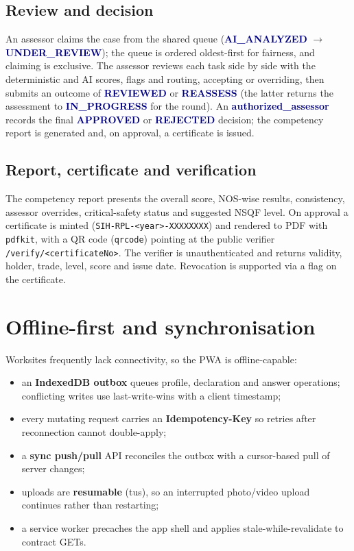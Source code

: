 \documentclass[11pt,a4paper]{article}
\newcommand{\code}[1]{\texttt{\small #1}}
\newcommand{\status}[1]{\textcolor{navy}{\textbf{#1}}}
\begin{document}
\subsection{Review and decision}
An assessor claims the case from the shared queue
(\status{AI\_ANALYZED} $\rightarrow$ \status{UNDER\_REVIEW}); the queue is
ordered oldest-first for fairness, and claiming is exclusive. The assessor
reviews each task side by side with the deterministic and AI scores, flags and
routing, accepting or overriding, then submits an outcome of \status{REVIEWED}
or \status{REASSESS} (the latter returns the assessment to
\status{IN\_PROGRESS} for the round). An \status{authorized_assessor} records
the final \status{APPROVED} or \status{REJECTED} decision; the competency
report is generated and, on approval, a certificate is issued.

\subsection{Report, certificate and verification}
The competency report presents the overall score, NOS-wise results,
consistency, assessor overrides, critical-safety status and suggested NSQF
level. On approval a certificate is minted
(\code{SIH-RPL-<year>-XXXXXXXX}) and rendered to PDF with \code{pdfkit}, with
a QR code (\code{qrcode}) pointing at the public verifier
\code{/verify/<certificateNo>}. The verifier is unauthenticated and returns
validity, holder, trade, level, score and issue date. Revocation is supported
via a flag on the certificate.

\section{Offline-first and synchronisation}
Worksites frequently lack connectivity, so the PWA is offline-capable:
\begin{itemize}
\item an \textbf{IndexedDB outbox} queues profile, declaration and answer
      operations; conflicting writes use last-write-wins with a client
      timestamp;
\item every mutating request carries an \textbf{Idempotency-Key} so retries
      after reconnection cannot double-apply;
\item a \textbf{sync push/pull} API reconciles the outbox with a cursor-based
      pull of server changes;
\item uploads are \textbf{resumable} (tus), so an interrupted photo/video
      upload continues rather than restarting;
\item a service worker precaches the app shell and applies
      stale-while-revalidate to contract GETs.
\end{itemize}
\end{document}
